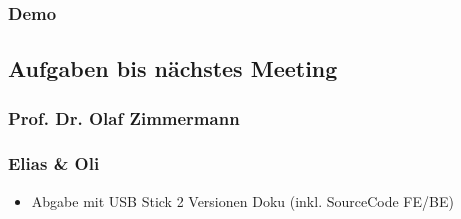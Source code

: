 \hypertarget{demo}{%
\subsubsection*{Demo}\label{demo}}

\hypertarget{aufgaben-bis-nuxe4chstes-meeting}{%
\subsection*{Aufgaben bis nächstes
Meeting}\label{aufgaben-bis-nuxe4chstes-meeting}}

\hypertarget{prof-dr-olaf-zimmermann}{%
\subsubsection*{Prof. Dr. Olaf
Zimmermann}\label{prof-dr-olaf-zimmermann}}

\hypertarget{elias--oli}{%
\subsubsection*{Elias \& Oli}\label{elias--oli}}

\begin{itemize}

\item
  Abgabe mit USB Stick 2 Versionen Doku (inkl. SourceCode FE/BE)
\end{itemize}